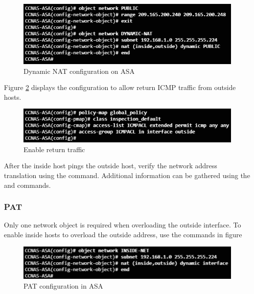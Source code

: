 \begin{figure}[hbtp]
\caption{Dynamic NAT configuration on ASA}\label{DynamicNAT}
\centering
\includegraphics[scale=0.7]{pictures/DynamicNAT.PNG}
\end{figure}

Figure \ref{DynamicNATreturn} displays the configuration to allow return ICMP traffic from outside hosts.

\begin{figure}[hbtp]
\caption{Enable return traffic}\label{DynamicNATreturn}
\centering
\includegraphics[scale=0.7]{pictures/DynamicNATreturn.PNG}
\end{figure}

After the inside host pings the outside host, verify the network address translation using the  command. Additional information can be gathered using the  and  commands.

\subsubsection{PAT}

Only one network object is required when overloading the outside interface. To enable inside hosts to overload the outside address, use the commands in figure 

\begin{figure}[hbtp]
\caption{PAT configuration in ASA}
\centering
\includegraphics[scale=0.7]{pictures/PAT.PNG}
\end{figure}
